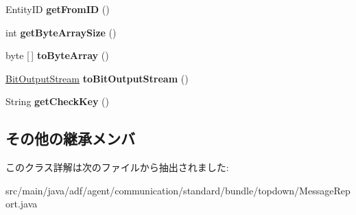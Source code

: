 \begin{DoxyCompactItemize}
\hypertarget{classadf_1_1agent_1_1communication_1_1standard_1_1bundle_1_1topdown_1_1MessageReport_ac62d8cb25b9bfc51d05e6da2d1a51dbb}{}\label{classadf_1_1agent_1_1communication_1_1standard_1_1bundle_1_1topdown_1_1MessageReport_ac62d8cb25b9bfc51d05e6da2d1a51dbb} 
Entity\+ID {\bfseries get\+From\+ID} ()
\item 
\hypertarget{classadf_1_1agent_1_1communication_1_1standard_1_1bundle_1_1topdown_1_1MessageReport_a172ff1c2f44340e4e777ec398ca375b6}{}\label{classadf_1_1agent_1_1communication_1_1standard_1_1bundle_1_1topdown_1_1MessageReport_a172ff1c2f44340e4e777ec398ca375b6} 
int {\bfseries get\+Byte\+Array\+Size} ()
\item 
\hypertarget{classadf_1_1agent_1_1communication_1_1standard_1_1bundle_1_1topdown_1_1MessageReport_a66f8fbce0907e7c1e38393c3eac4f314}{}\label{classadf_1_1agent_1_1communication_1_1standard_1_1bundle_1_1topdown_1_1MessageReport_a66f8fbce0907e7c1e38393c3eac4f314} 
byte \mbox{[}$\,$\mbox{]} {\bfseries to\+Byte\+Array} ()
\item 
\hypertarget{classadf_1_1agent_1_1communication_1_1standard_1_1bundle_1_1topdown_1_1MessageReport_a4be5a027ef35e18fa33f8dd8dee6897d}{}\label{classadf_1_1agent_1_1communication_1_1standard_1_1bundle_1_1topdown_1_1MessageReport_a4be5a027ef35e18fa33f8dd8dee6897d} 
\hyperlink{classadf_1_1component_1_1communication_1_1util_1_1BitOutputStream}{Bit\+Output\+Stream} {\bfseries to\+Bit\+Output\+Stream} ()
\item 
\hypertarget{classadf_1_1agent_1_1communication_1_1standard_1_1bundle_1_1topdown_1_1MessageReport_a2c8543070ef59b266367bedb9e75321f}{}\label{classadf_1_1agent_1_1communication_1_1standard_1_1bundle_1_1topdown_1_1MessageReport_a2c8543070ef59b266367bedb9e75321f} 
String {\bfseries get\+Check\+Key} ()
\end{DoxyCompactItemize}
\subsection*{その他の継承メンバ}


このクラス詳解は次のファイルから抽出されました\+:\begin{DoxyCompactItemize}
\item 
src/main/java/adf/agent/communication/standard/bundle/topdown/Message\+Report.\+java\end{DoxyCompactItemize}
